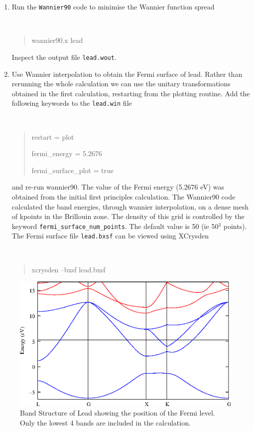 \documentclass[a4paper,11pt,twoside]{article}
\begin{document}
\begin{enumerate}
\item Run the {\tt Wannier90} code to minimise the Wannier function spread
{\tt
\begin{quote}
wannier90.x lead
\end{quote} }
Inspect the output file {\tt lead.wout}.
\item Use Wannier interpolation to obtain the Fermi surface of lead. Rather than rerunning the whole calculation we can use the unitary transformations obtained in the first calculation, restarting from the plotting routine. Add the following keywords to the {\tt lead.win} file
{\tt
\begin{quote}
restart = plot

fermi\_energy = 5.2676

fermi\_surface\_plot = true
\end{quote} }
and re-run wannier90. The value of the Fermi energy (5.2676 eV) was obtained from the initial first principles calculation. The Wannier90 code calculated the band energies, through wannier interpolation, on a dense mesh of kpoints in the Brillouin zone. The density of this grid is controlled by the keyword {\tt fermi\_surface\_num\_points}. The default value is 50 (ie 50$^3$ points).
The Fermi surface file {\tt lead.bxsf} can be viewed using XCrysden
{\tt
\begin{quote}
xcrysden --bxsf lead.bxsf
\end{quote} }
\end{enumerate}

\begin{figure}[h]
\begin{center}
\includegraphics{lead.eps}
\caption{Band Structure of Lead showing the position of the Fermi level. Only the lowest 4 bands are included in the calculation.}
\label{fig:pb-bnd}
\end{center}
\end{figure}
\end{document}
